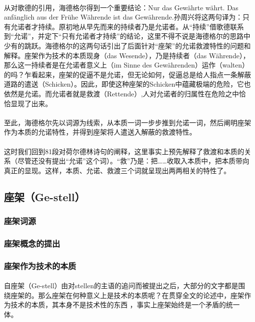 \documentclass{article}
\begin{document}
			\paragraph{}
		从对歌德的引用，海德格尔得到一个重要结论：Nur das Gewährte währt. Das anfänglich aus der Frühe Währende ist das Gewährende.\cite{Frage_n_Tech}孙周兴将这两句译为：只有允诺者才持续。原初地从早先而来的持续者乃是允诺者。\cite[pg. 949]{slct_Hei_Szx}从“持续”借歌德联系到“允诺”，并定下“只有允诺者才持续”的结论，这里不得不说是海德格尔的思路中少有的跳跃。海德格尔的这两句话引出了后面针对“座架”的允诺救渡特性的问题和解释。座架作为技术的本质现身（das Wesende），乃是持续者（das Währende），那么这一持续者是在允诺者意义上（im Sinne des Gewährenden）运作（walten）的吗？\cite[pg. 949]{slct_Hei_Szx}乍看起来，座架的促逼不是允诺，但无论如何，促逼总是给人指点一条解蔽道路的遣送（Schicken）。因此，即使这种座架的Schicken中蕴藏极端的危险，它也依然是允诺。而允诺者就是救渡（Rettende）,人对允诺者的归属性在危险之中恰恰显现了出来。
			\paragraph{}
		至此，海德格尔先以词源为线索，从本质一词一步步推到允诺一词，然后阐明座架作为本质的允诺特性，并得到座架将人遣送入解蔽的救渡特性。
			\paragraph{}
		这时我们回到81段对荷尔德林诗句的阐释，这里事实上预先解释了救渡和本质的关系（尽管还没有提出“允诺”这个词）。“救”乃是：把……收取入本质中，把本质带向真正的显现。这样，本质、允诺、救渡三个词就呈现出两两相关的特性了。
	\subsection{座架（Ge-stell）}
		\subsubsection{座架词源}
		\subsubsection{座架概念的提出}
		\subsubsection{座架作为技术的本质}
		\paragraph{}
		自座架（Ge-stell）由对stellen的主语的追问而被提出之后，大部分的文字都是围绕座架的。那么座架在何种意义上是技术的本质呢？在贯穿全文的论述中，座架作为技术的本质，其本身不是技术性的东西 ，事实上座架始终是一个矛盾的统一体。
\end{document}

